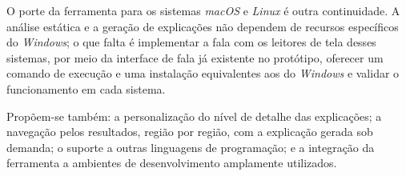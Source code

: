 \documentclass[
    12pt,                   %
    openright,              %
    oneside,                %
    a4paper,                %
    sumario=tradicional,    %
    english,                %
    brazil,                 %
    ]{abntex2}
\begin{document}
O porte da ferramenta para os sistemas \textit{macOS} e \textit{Linux} é outra continuidade. A análise estática e a geração de explicações não dependem de recursos específicos do \textit{Windows}; o que falta é implementar a fala com os leitores de tela desses sistemas, por meio da interface de fala já existente no protótipo, oferecer um comando de execução e uma instalação equivalentes aos do \textit{Windows} e validar o funcionamento em cada sistema.

Propõem-se também: a personalização do nível de detalhe das explicações; a navegação pelos resultados, região por região, com a explicação gerada sob demanda; o suporte a outras linguagens de programação; e a integração da ferramenta a ambientes de desenvolvimento amplamente utilizados.


%
%
\end{document}

